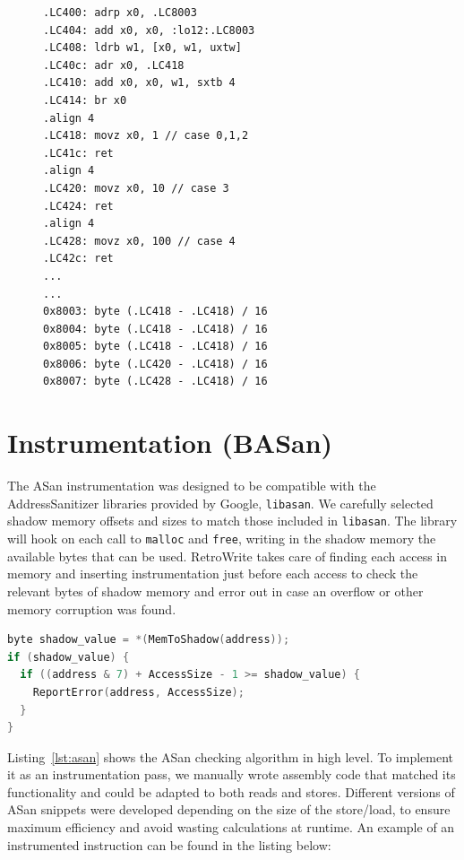 \documentclass[a4paper,11pt,oneside]{report}
\newcommand{\sysname}{RetroWrite\xspace}
\begin{document}
\begin{figure}[h]
\begin{lstlisting}[basicstyle=\ttfamily\small,numbers=none]
.LC400: adrp x0, .LC8003
.LC404: add x0, x0, :lo12:.LC8003
.LC408: ldrb w1, [x0, w1, uxtw]
.LC40c: adr x0, .LC418
.LC410: add x0, x0, w1, sxtb 4
.LC414: br x0
.align 4
.LC418: movz x0, 1 // case 0,1,2
.LC41c: ret
.align 4
.LC420: movz x0, 10 // case 3
.LC424: ret
.align 4
.LC428: movz x0, 100 // case 4
.LC42c: ret
...
...
0x8003: byte (.LC418 - .LC418) / 16
0x8004: byte (.LC418 - .LC418) / 16
0x8005: byte (.LC418 - .LC418) / 16
0x8006: byte (.LC420 - .LC418) / 16
0x8007: byte (.LC428 - .LC418) / 16
\end{lstlisting}
\label{enlarged}
\end{figure}


\section{Instrumentation (BASan)}
The ASan instrumentation was designed to be compatible with the 
AddressSanitizer libraries provided by Google, \texttt{libasan}. We carefully 
selected shadow memory offsets and sizes to match those included in 
\texttt{libasan}.  The library will hook on each call to \texttt{malloc} and 
\texttt{free}, writing in the shadow memory the available bytes that can be 
used. \sysname takes care of finding each access in memory and inserting 
instrumentation just before each access to check the relevant bytes of shadow 
memory and error out in case an overflow or other memory corruption was found.


\begin{lstlisting}[float,floatplacement=H,language=C,label={lst:asan},caption={ASan checking algorithm 
implemented in C}]
byte shadow_value = *(MemToShadow(address));
if (shadow_value) {
  if ((address & 7) + AccessSize - 1 >= shadow_value) {
	ReportError(address, AccessSize);
  }
}
\end{lstlisting}

Listing~\ref{lst:asan} shows the ASan checking algorithm in high level. To 
implement it as an instrumentation pass, we manually wrote assembly code that 
matched its functionality and could be adapted to both reads and stores.  
Different versions of ASan snippets were developed depending on the size of the 
store/load, to ensure maximum efficiency and avoid wasting calculations at 
runtime. An example of an instrumented instruction can be found in the listing 
below:
\end{document}
